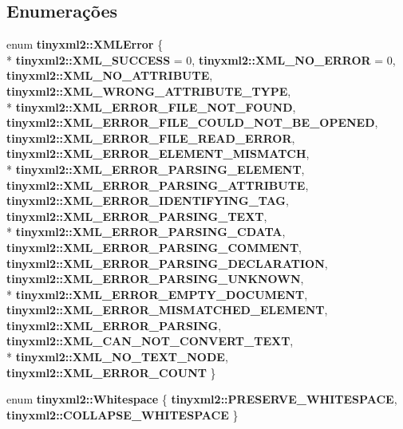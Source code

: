 \subsection*{Enumerações}
\begin{DoxyCompactItemize}
\item 
enum {\bf tinyxml2\+::\+X\+M\+L\+Error} \{ \\*
{\bf tinyxml2\+::\+X\+M\+L\+\_\+\+S\+U\+C\+C\+E\+SS} = 0, 
{\bf tinyxml2\+::\+X\+M\+L\+\_\+\+N\+O\+\_\+\+E\+R\+R\+OR} = 0, 
{\bf tinyxml2\+::\+X\+M\+L\+\_\+\+N\+O\+\_\+\+A\+T\+T\+R\+I\+B\+U\+TE}, 
{\bf tinyxml2\+::\+X\+M\+L\+\_\+\+W\+R\+O\+N\+G\+\_\+\+A\+T\+T\+R\+I\+B\+U\+T\+E\+\_\+\+T\+Y\+PE}, 
\\*
{\bf tinyxml2\+::\+X\+M\+L\+\_\+\+E\+R\+R\+O\+R\+\_\+\+F\+I\+L\+E\+\_\+\+N\+O\+T\+\_\+\+F\+O\+U\+ND}, 
{\bf tinyxml2\+::\+X\+M\+L\+\_\+\+E\+R\+R\+O\+R\+\_\+\+F\+I\+L\+E\+\_\+\+C\+O\+U\+L\+D\+\_\+\+N\+O\+T\+\_\+\+B\+E\+\_\+\+O\+P\+E\+N\+ED}, 
{\bf tinyxml2\+::\+X\+M\+L\+\_\+\+E\+R\+R\+O\+R\+\_\+\+F\+I\+L\+E\+\_\+\+R\+E\+A\+D\+\_\+\+E\+R\+R\+OR}, 
{\bf tinyxml2\+::\+X\+M\+L\+\_\+\+E\+R\+R\+O\+R\+\_\+\+E\+L\+E\+M\+E\+N\+T\+\_\+\+M\+I\+S\+M\+A\+T\+CH}, 
\\*
{\bf tinyxml2\+::\+X\+M\+L\+\_\+\+E\+R\+R\+O\+R\+\_\+\+P\+A\+R\+S\+I\+N\+G\+\_\+\+E\+L\+E\+M\+E\+NT}, 
{\bf tinyxml2\+::\+X\+M\+L\+\_\+\+E\+R\+R\+O\+R\+\_\+\+P\+A\+R\+S\+I\+N\+G\+\_\+\+A\+T\+T\+R\+I\+B\+U\+TE}, 
{\bf tinyxml2\+::\+X\+M\+L\+\_\+\+E\+R\+R\+O\+R\+\_\+\+I\+D\+E\+N\+T\+I\+F\+Y\+I\+N\+G\+\_\+\+T\+AG}, 
{\bf tinyxml2\+::\+X\+M\+L\+\_\+\+E\+R\+R\+O\+R\+\_\+\+P\+A\+R\+S\+I\+N\+G\+\_\+\+T\+E\+XT}, 
\\*
{\bf tinyxml2\+::\+X\+M\+L\+\_\+\+E\+R\+R\+O\+R\+\_\+\+P\+A\+R\+S\+I\+N\+G\+\_\+\+C\+D\+A\+TA}, 
{\bf tinyxml2\+::\+X\+M\+L\+\_\+\+E\+R\+R\+O\+R\+\_\+\+P\+A\+R\+S\+I\+N\+G\+\_\+\+C\+O\+M\+M\+E\+NT}, 
{\bf tinyxml2\+::\+X\+M\+L\+\_\+\+E\+R\+R\+O\+R\+\_\+\+P\+A\+R\+S\+I\+N\+G\+\_\+\+D\+E\+C\+L\+A\+R\+A\+T\+I\+ON}, 
{\bf tinyxml2\+::\+X\+M\+L\+\_\+\+E\+R\+R\+O\+R\+\_\+\+P\+A\+R\+S\+I\+N\+G\+\_\+\+U\+N\+K\+N\+O\+WN}, 
\\*
{\bf tinyxml2\+::\+X\+M\+L\+\_\+\+E\+R\+R\+O\+R\+\_\+\+E\+M\+P\+T\+Y\+\_\+\+D\+O\+C\+U\+M\+E\+NT}, 
{\bf tinyxml2\+::\+X\+M\+L\+\_\+\+E\+R\+R\+O\+R\+\_\+\+M\+I\+S\+M\+A\+T\+C\+H\+E\+D\+\_\+\+E\+L\+E\+M\+E\+NT}, 
{\bf tinyxml2\+::\+X\+M\+L\+\_\+\+E\+R\+R\+O\+R\+\_\+\+P\+A\+R\+S\+I\+NG}, 
{\bf tinyxml2\+::\+X\+M\+L\+\_\+\+C\+A\+N\+\_\+\+N\+O\+T\+\_\+\+C\+O\+N\+V\+E\+R\+T\+\_\+\+T\+E\+XT}, 
\\*
{\bf tinyxml2\+::\+X\+M\+L\+\_\+\+N\+O\+\_\+\+T\+E\+X\+T\+\_\+\+N\+O\+DE}, 
{\bf tinyxml2\+::\+X\+M\+L\+\_\+\+E\+R\+R\+O\+R\+\_\+\+C\+O\+U\+NT}
 \}
\item 
enum {\bf tinyxml2\+::\+Whitespace} \{ {\bf tinyxml2\+::\+P\+R\+E\+S\+E\+R\+V\+E\+\_\+\+W\+H\+I\+T\+E\+S\+P\+A\+CE}, 
{\bf tinyxml2\+::\+C\+O\+L\+L\+A\+P\+S\+E\+\_\+\+W\+H\+I\+T\+E\+S\+P\+A\+CE}
 \}
\end{DoxyCompactItemize}


